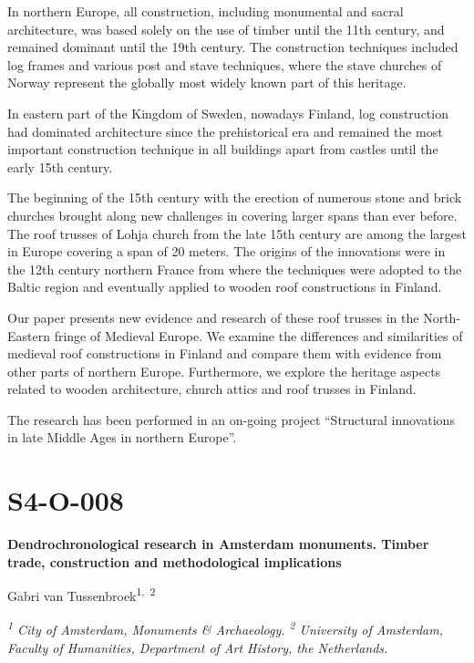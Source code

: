 \documentclass[
]{book}
\begin{document}
In northern Europe, all construction, including monumental and sacral architecture, was based solely on the use of timber until the 11th century, and remained dominant until the 19th century. The construction techniques included log frames and various post and stave techniques, where the stave churches of Norway represent the globally most widely known part of this heritage.

In eastern part of the Kingdom of Sweden, nowadays Finland, log construction had dominated architecture since the prehistorical era and remained the most important construction technique in all buildings apart from castles until the early 15th century.

The beginning of the 15th century with the erection of numerous stone and brick churches brought along new challenges in covering larger spans than ever before. The roof trusses of Lohja church from the late 15th century are among the largest in Europe covering a span of 20 meters. The origins of the innovations were in the 12th century northern France from where the techniques were adopted to the Baltic region and eventually applied to wooden roof constructions in Finland.

Our paper presents new evidence and research of these roof trusses in the North-Eastern fringe of Medieval Europe. We examine the differences and similarities of medieval roof constructions in Finland and compare them with evidence from other parts of northern Europe. Furthermore, we explore the heritage aspects related to wooden architecture, church attics and roof trusses in Finland.

The research has been performed in an on-going project ``Structural innovations in late Middle Ages in northern Europe''.

\hypertarget{s4-o-008}{%
\section*{S4-O-008}\label{s4-o-008}}

\textbf{Dendrochronological research in Amsterdam monuments. Timber trade, construction and methodological implications}

Gabri van Tussenbroek\textsuperscript{1,~2}

\emph{\textsuperscript{1} City of Amsterdam, Monuments \& Archaeology. \textsuperscript{2} University of Amsterdam, Faculty of Humanities, Department of Art History, the Netherlands.}
\end{document}
